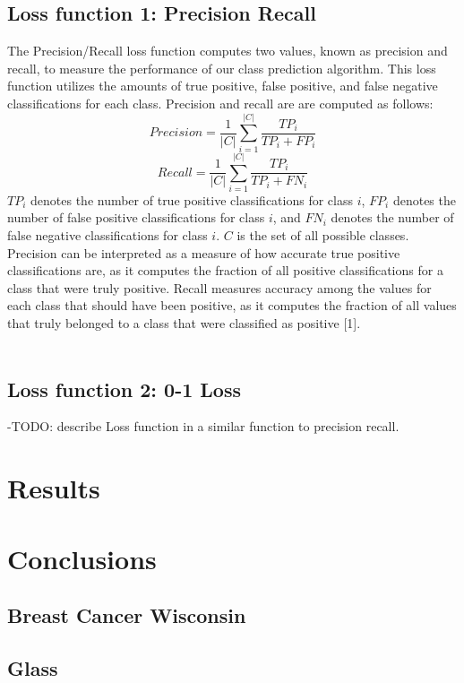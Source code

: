\documentclass[twoside,11pt]{article}
\begin{document}
\subsection{Loss function 1: Precision Recall}
The Precision/Recall loss function computes two values, known as precision and recall, to measure the performance of our class prediction algorithm. This loss function utilizes the amounts of true positive, false positive, and false negative classifications for each class. Precision and recall are are computed as follows: 
$$Precision = \frac{1}{|C|} \sum^{|C|}_{i=1} \frac{TP_i}{TP_i + FP_i}$$
$$Recall = \frac{1}{|C|} \sum^{|C|}_{i=1} \frac{TP_i}{TP_i + FN_i}$$
$TP_i$ denotes the number of true positive classifications for class $i$, $FP_i$ denotes the number of false positive classifications for class $i$, and $FN_i$ denotes the number of false negative classifications for class $i$. $C$ is the set of all possible classes. Precision can be interpreted as a measure of how accurate true positive classifications are, as it computes the fraction of all positive classifications for a class that were truly positive. Recall measures accuracy among the values for each class that should have been positive, as it computes the fraction of all values that truly belonged to a class that were classified as positive [1]. \\ \\

\subsection{Loss function 2: 0-1 Loss}
-TODO: describe Loss function in a similar function to precision recall.


\section{Results}

\section{Conclusions}
\subsection{Breast Cancer Wisconsin}
\subsection{Glass}
\end{document}
